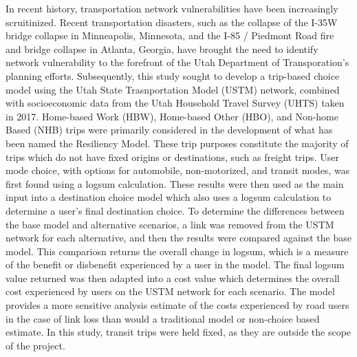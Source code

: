 \afterpage{\cleardoublepage}

In recent history, transportation network vulnerabilities have been increasingly
scruitinized. Recent transportation disasters, such as the collapse of the I-35W
bridge collapse in Minneapolis, Minnesota, and the I-85 / Piedmont Road fire
and bridge collapse in Atlanta, Georgia, have brought the need to identify
network vulnerability to the forefront of the Utah Department of Transporation's
planning efforts. Subsequently, this study sought to develop a trip-based
choice model using the Utah State Trasnportation Model (USTM) network, combined
with socioeconomic data from the Utah Household Travel Survey (UHTS) taken in
2017. Home-based Work (HBW), Home-based Other (HBO), and Non-home Based (NHB)
trips were primarily considered in the development of what has been named the
Resiliency Model. These trip purposes constitute the majority of trips which
do not have fixed origins or destinations, such as freight trips. User mode
choice, with options for automobile, non-motorized, and transit modes, was first
found using a logsum calculation. These results were then used as the main
input into a destination choice model which also uses a logsum calculation to
determine a user's final destination choice. To determine the differences 
between the base model and alternative scenarios, a link was removed from the
USTM network for each alternative, and then the results were compared against
the base model. This compariosn returns the overall change in logsum, which is
a measure of the benefit or disbenefit experienced by a user in the model.
The final logsum value returned was then adapted into a cost value which
determines the overall cost experienced by users on the USTM network for each
scenario. The model provides a more sensitive analysis estimate of the costs
experienced by road users in the case of link loss than would a traditional
model or non-choice based estimate. In this study, transit trips were held
fixed, as they are outside the scope of the project.
